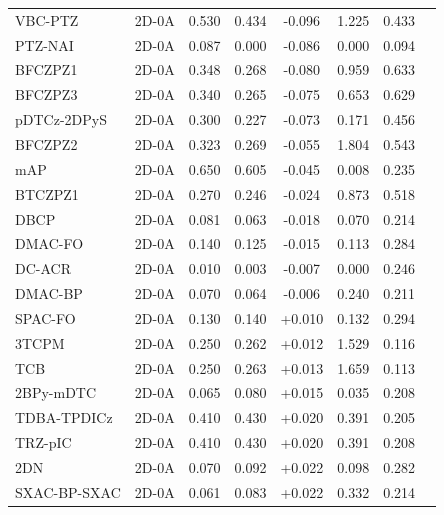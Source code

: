 \begin{longtable}{llcccccc}
VBC-PTZ & 2D-0A & 0.530 & 0.434 & -0.096 & 1.225 & 0.433 & \cite{doi101039D1NJ05960B} \\
PTZ-NAI & 2D-0A & 0.087 & 0.000 & -0.086 & 0.000 & 0.094 & \cite{doi101016jorgel2020106012} \\
BFCZPZ1 & 2D-0A & 0.348 & 0.268 & -0.080 & 0.959 & 0.633 & \cite{doi101016jcej2020127591} \\
BFCZPZ3 & 2D-0A & 0.340 & 0.265 & -0.075 & 0.653 & 0.629 & \cite{doi101016jcej2020127591} \\
pDTCz-2DPyS & 2D-0A & 0.300 & 0.227 & -0.073 & 0.171 & 0.456 & \cite{doi101039C9TC01498E} \\
BFCZPZ2 & 2D-0A & 0.323 & 0.269 & -0.055 & 1.804 & 0.543 & \cite{doi101016jcej2020127591} \\
mAP & 2D-0A & 0.650 & 0.605 & -0.045 & 0.008 & 0.235 & \cite{doi101039D0TC04315J} \\
BTCZPZ1 & 2D-0A & 0.270 & 0.246 & -0.024 & 0.873 & 0.518 & \cite{doi101016jcej2020127591} \\
DBCP & 2D-0A & 0.081 & 0.063 & -0.018 & 0.070 & 0.214 & \cite{doi101016jcej2022134731} \\
DMAC-FO & 2D-0A & 0.140 & 0.125 & -0.015 & 0.113 & 0.284 & \cite{doi101016jorgel201906008} \\
DC-ACR & 2D-0A & 0.010 & 0.003 & -0.007 & 0.000 & 0.246 & \cite{doi101039C7TC01164D} \\
DMAC-BP & 2D-0A & 0.070 & 0.064 & -0.006 & 0.240 & 0.211 & \cite{doi101016jorgel201804035} \\
SPAC-FO & 2D-0A & 0.130 & 0.140 & +0.010 & 0.132 & 0.294 & \cite{doi101016jorgel201906008} \\
3TCPM & 2D-0A & 0.250 & 0.262 & +0.012 & 1.529 & 0.116 & \cite{doi101016jdyepig2021109208} \\
TCB & 2D-0A & 0.250 & 0.263 & +0.013 & 1.659 & 0.113 & \cite{doi101016jdyepig2021109208} \\
2BPy-mDTC & 2D-0A & 0.065 & 0.080 & +0.015 & 0.035 & 0.208 & \cite{doi101039C7TC00457E} \\
TDBA-TPDICz & 2D-0A & 0.410 & 0.430 & +0.020 & 0.391 & 0.205 & \cite{doi101016jdyepig2020108485} \\
TRZ-pIC & 2D-0A & 0.410 & 0.430 & +0.020 & 0.391 & 0.208 & \cite{doi101016jdyepig2020108485} \\
2DN & 2D-0A & 0.070 & 0.092 & +0.022 & 0.098 & 0.282 & \cite{doi101016jjlumin2021118683} \\
SXAC-BP-SXAC & 2D-0A & 0.061 & 0.083 & +0.022 & 0.332 & 0.214 & \cite{doi101016jcej2022134934} \\

\end{longtable}

